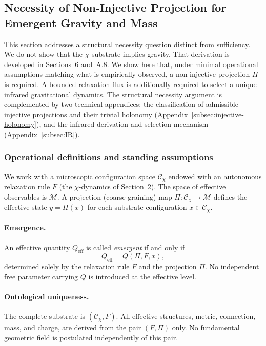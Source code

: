 \subsection{Necessity of Non-Injective Projection for Emergent Gravity and Mass}
  \label{sec:necessity-noninjective}

  This section addresses a structural necessity question distinct from sufficiency.
  We do not show that the $\chi$-substrate implies gravity.
  That derivation is developed in Sections~6 and~A.8.
  We show here that, under minimal operational assumptions matching what is empirically observed,
  a non-injective projection $\Pi$ is required.
  A bounded relaxation flux is additionally required to select a unique infrared gravitational dynamics.
  The structural necessity argument is complemented by two technical appendices:
  the classification of admissible injective projections and their trivial holonomy
  (Appendix~\ref{subsec:injective-holonomy}),
  and the infrared derivation and selection mechanism
  (Appendix~\ref{subsec:IR}).

  \subsubsection*{Operational definitions and standing assumptions}
    \label{subsec:necessity-defs}

    We work with a microscopic configuration space $\mathcal{C}_\chi$ endowed with an autonomous
    relaxation rule $F$ (the $\chi$-dynamics of Section~2).
    The space of effective observables is $\mathcal{M}$.
    A projection (coarse-graining) map $\Pi : \mathcal{C}_\chi \to \mathcal{M}$ defines the
    effective state $y = \Pi(x)$ for each substrate configuration $x \in \mathcal{C}_\chi$.

    \paragraph{Emergence.}
      An effective quantity $Q_{\mathrm{eff}}$ is called \emph{emergent} if and only if
    \begin{equation}
      Q_{\mathrm{eff}} = Q(\Pi, F, x),
      \end{equation}
      determined solely by the relaxation rule $F$ and the projection $\Pi$.
      No independent free parameter carrying $Q$ is introduced at the effective level.

    \paragraph{Ontological uniqueness.}
      The complete substrate is $(\mathcal{C}_\chi, F)$.
      All effective structures, metric, connection, mass, and charge, are derived from the pair $(F, \Pi)$ only.
      No fundamental geometric field is postulated independently of this pair.

